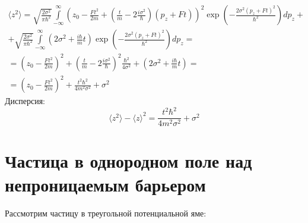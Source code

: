 \[
	\begin{gathered}
		\langle z^2 \rangle =
		\sqrt{\frac{2\sigma^2}{\pi \hbar^2}} 
		\int\limits_{-\infty}^{\infty} \left(z_0 - \frac{F t^2}{2m} + \left(\frac{t}{m}- 2\frac{i \sigma^2}{\hbar}\right) (p_z + Ft)\right)^2
		\exp\left( - \frac{2\sigma^2 (p_z + Ft)^2}{\hbar^2} \right) dp_z + \\
		+
		\sqrt{\frac{2\sigma^2}{\pi \hbar^2}} 
		\int\limits_{-\infty}^{\infty} \left(2\sigma^2 + \frac{i\hbar}{m} t \right)
		\exp\left( - \frac{2\sigma^2 (p_z + Ft)^2}{\hbar^2} \right) dp_z = \\
		=
		\left(z_0 - \frac{F t^2}{2m}\right)^2 +
		\left(\frac{t}{m}- 
		2\frac{i \sigma^2}{\hbar}\right)^2 \frac{\hbar^2}{4 \sigma^2} +
		\left(2\sigma^2 + \frac{i\hbar}{m} t \right) = \\
		=
		\left(z_0 - \frac{F t^2}{2m}\right)^2 +
		\frac{t^2\hbar^2}{4 m^2 \sigma^2} + \sigma^2
	\end{gathered}
\]
Дисперсия:
\[
	\langle z^2 \rangle - \langle z \rangle^2 =
	\frac{t^2\hbar^2}{4 m^2 \sigma^2} + \sigma^2
\]

\section{Частица в однородном поле над непроницаемым барьером}

Рассмотрим частицу в треугольной потенциальной яме:

